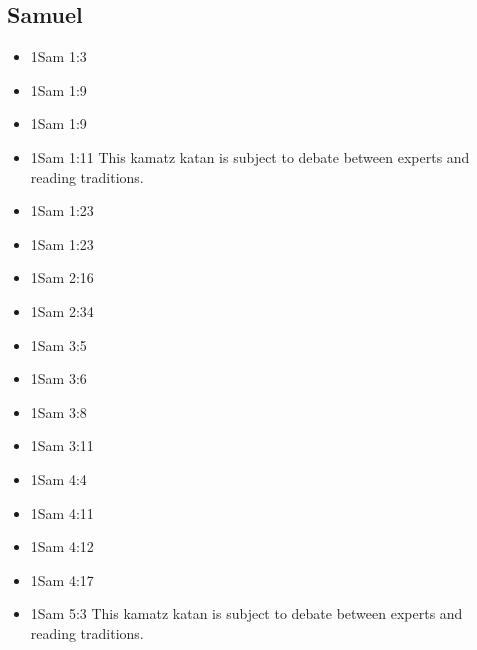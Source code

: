 \documentclass[14pt]{article}
\begin{document}
	\subsection{Samuel}
		
	\begin{multicols}{2}\begin{itemize}
					
					\item 1Sam 1:3
					
					\item 1Sam 1:9
					
					\item 1Sam 1:9
					
					\item 1Sam 1:11 This kamatz katan is subject to debate between experts and reading traditions.
					
					\item 1Sam 1:23
					
					\item 1Sam 1:23
							
							\item 1Sam 2:16
							
							\item 1Sam 2:34
							
							\item 1Sam 3:5
							
							\item 1Sam 3:6
							
							\item 1Sam 3:8
							
							\item 1Sam 3:11
							
							\item 1Sam 4:4
							
							\item 1Sam 4:11
							
							\item 1Sam 4:12
							
							\item 1Sam 4:17
							
							\item 1Sam 5:3 This kamatz katan is subject to debate between experts and reading traditions.
							

\end{itemize}
\end{multicols}
\end{document}
